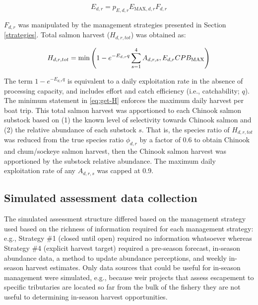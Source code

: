 \documentclass[12pt,]{book}
\theoremstyle{definition}
\theoremstyle{definition}
\theoremstyle{definition}
\theoremstyle{remark}
\begin{document}
\begin{equation}
  E_{d,r} = p_{E,d,r} E_{\text{MAX},d,r} F_{d,r}
  \label{eq:get-E}
\end{equation}

\noindent
\(F_{d,r}\) was manipulated by the management strategies presented in
Section \ref{strategies}. Total salmon harvest (\(H_{d,r,tot}\)) was
obtained as:

\begin{equation}
  H_{d,r,tot}=\text{min} \left(1 - e^{-E_{d,r} q} \sum_{s=1}^4 A_{d,r,s}, \space E_{d,r} CPB_{\text{MAX}} \right)
  \label{eq:get-H}
\end{equation}

\noindent
The term \(1 - e^{-E_{d,r} q}\) is equivalent to a daily exploitation
rate in the absence of processing capacity, and includes effort and
catch efficiency (i.e., catchability; \(q\)). The minimum statement in
\eqref{eq:get-H} enforces the maximum daily harvest per boat trip. This
total salmon harvest was apportioned to each Chinook salmon substock
based on (1) the known level of selectivity towards Chinook salmon and
(2) the relative abundance of each substock \(s\). That is, the species
ratio of \(H_{d,r,tot}\) was reduced from the true species ratio
\(\phi_{d,r}\) by a factor of 0.6 to obtain Chinook and chum/sockeye
salmon harvest, then the Chinook salmon harvest was apportioned by the
substock relative abundance. The maximum daily exploitation rate of any
\(A_{d,r,s}\) was capped at 0.9.

\subsection{Simulated assessment data
collection}\label{simulated-assessment-data-collection}

\noindent
The simulated assessment structure differed based on the management
strategy used based on the richness of information required for each
management strategy: e.g., Strategy \#1 (closed until open) required no
information whatsoever whereas Strategy \#4 (explicit harvest target)
required a pre-season forecast, in-season abundance data, a method to
update abundance perceptions, and weekly in-season harvest estimates.
Only data sources that could be useful for in-season management were
simulated, e.g., because weir projects that assess escapement to
specific tributaries are located so far from the bulk of the fishery
they are not useful to determining in-season harvest opportunities.
\end{document}
